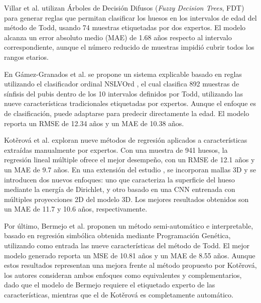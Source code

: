 Villar et al. \cite{villar2017first} utilizan Árboles de Decisión Difusos (\textit{Fuzzy Decision Trees}, FDT) para generar reglas que permitan clasificar los huesos en los intervalos de edad del método de Todd, usando 74 muestras etiquetadas por dos expertos. El modelo alcanza un error absoluto medio (MAE) de 1.68 años respecto al intervalo correspondiente, aunque el número reducido de muestras impidió cubrir todos los rangos etarios.

En Gámez-Granados et al. \cite{granados} se propone un sistema explicable basado en reglas utilizando el clasificador ordinal NSLVOrd \cite{gamez2016ordinal}, el cual clasifica 892 muestras de sínfisis del pubis dentro de los 10 intervalos definidos por Todd, utilizando las nueve características tradicionales etiquetadas por expertos. Aunque el enfoque es de clasificación, puede adaptarse para predecir directamente la edad. El modelo reporta un RMSE de 12.34 años y un MAE de 10.38 años.

Kotěrová et al. \cite{kotverova2018age} exploran nueve métodos de regresión aplicados a características extraídas manualmente por expertos. Con una muestra de 941 huesos, la regresión lineal múltiple ofrece el mejor desempeño, con un RMSE de 12.1 años y un MAE de 9.7 años. En una extensión del estudio \cite{koterova_computational_2022}, se incorporan mallas 3D y se introducen dos nuevos enfoques: uno que caracteriza la superficie del hueso mediante la energía de Dirichlet, y otro basado en una CNN entrenada con múltiples proyecciones 2D del modelo 3D. Los mejores resultados obtenidos son un MAE de 11.7 y 10.6 años, respectivamente.

Por último, Bermejo et al. \cite{bermejo_interpretable_2025} proponen un método semi-automático e interpretable, basado en regresión simbólica obtenida mediante Programación Genética, utilizando como entrada las nueve características del método de Todd. El mejor modelo generado reporta un MSE de 10.81 años y un MAE de 8.55 años. Aunque estos resultados representan una mejora frente al método propuesto por Kotěrová, los autores consideran ambos enfoques como equivalentes y complementarios, dado que el modelo de Bermejo requiere el etiquetado experto de las características, mientras que el de Kotěrová es completamente automático.

